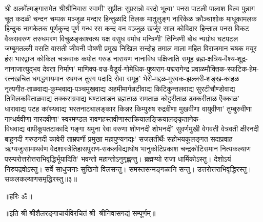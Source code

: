 \begin{flushleft}
श्री अलर्मेल्मङ्गासमेत श्रीश्रीनिवास स्वामी' सुप्रीतः सुप्रसन्नो वरदो
भूत्वा' पनस पाटली पालाश बिल्व पुन्नाग चूत कदळी चन्दन
चम्पक मञ्जुळ मन्दार हिन्तुळादि तिलक मातुलुङ्ग नारिकेळ
क्रौञ्चाशोक माधूकामलक हिन्दुक नागकेतक पूर्णकुन्द पूर्ण गन्ध रस
कन्द वन वञ्जुळ खर्जूर साल कोविदार हिन्ताल पनस विकट
वैकसवरुण तरुधमरण विचुळङ्काश्वत्थ यक्ष वसुध वर्माध मन्त्रिणी'
तिन्त्रिणी बोध न्यग्रोध घटपटल जम्बूमतल्ली वसति वासती जीवनी
पोषणी प्रमुख निखिल सन्दोह तमाल माला महित विराजमान चषक
मयूर हंस भारद्वाज कोकिल चक्रवाक कपोत गरुड नारायण नानाविध पक्षिजाति समूह ब्रह्म-क्षत्रिय-वैश्य-शूद्र-नानाजात्युद्भव देवता
निर्माण' माणिक्य-वज्र-वैडूर्य-गोमेधिक-पुष्यराग-पद्मरागेन्द्र प्रवाळमौक्तिक-स्फटिक-हेम-रत्नखचित धगद्धगायमान रथगज
तुरग पदादि सेवा समूह' भेरी-मद्दळ-मुरवक-झल्लरी-शङ्ख-काहळ नृत्यगीत-ताळवाद्य-कुम्भवाद्य-पञ्चमुखवाद्य अहमीमार्गन्नटीवाद्य किटिकुन्तलवाद्य सुरटीचौण्डोवाद्य तिमिलकविताळवाद्य
तक्कराग्रवाद्य घण्टाताडन ब्रह्मताळ समताळ कोट्टरीताळ ढक्करीताळ ऎक्काळ' धारावाद्य पटह कांस्यवाद्य भरतनाट्यालङ्कार किन्नर किम्पुरुष
रुद्रवीणा मुखवीणा वायुवीणा' तुम्बुरुवीणा गान्धर्ववीणा नारदवीणा' स्वरमण्डल रावणहस्तवीणास्तक्रियालङ्क्रियालङ्कृतानेक-\\विधवाद्य वापीकूपतटाकादि गङ्गा यमुना रेवा वरुणा शोणनदी शोभनदी'
सुवर्णमुखी वेगवती वेत्रवती क्षीरनदी बाहुनदी गरुडनदी कावेरी ताम्रपर्णी प्रमुखा महापुण्यनद्यः' सजलतीर्थैः सहोभयकूलङ्गत सदाप्रवाह ऋग्यजुःसामाथर्वण वेदशास्त्रेतिहासपुराण-सकलविद्याघोष भानुकोटिप्रकाश चन्द्रकोटिसमान नित्यकल्याण परम्परोत्तरोत्तराभिवृद्धिर्भूयादिति' भवन्तो महान्तोऽनुगृह्णन्तु। 
ब्रह्मण्यो राजा धार्मिकोऽस्तु। देशोऽयं निरुपद्रवोऽस्तु।
सर्वे साधुजनाः सुखिनो विलसन्तु। समस्तसन्मङ्गळानि सन्तु। उत्तरोत्तराभिवृद्धिरस्तु। सकलकल्याणसमृद्धिरस्तु॥३॥
\centerline{॥हरिः ॐ॥}
\centerline{॥इति श्री श्रीशैलरङ्गाचार्यविरचितं श्री~श्रीनिवासगद्यं सम्पूर्णम्॥}
\end{flushleft}